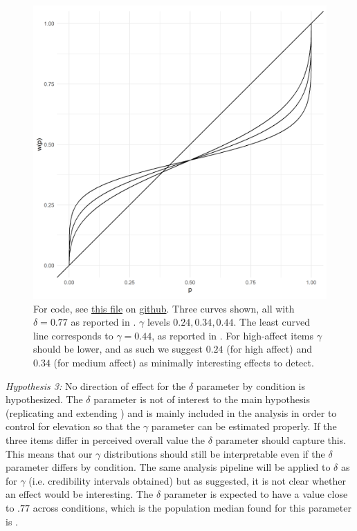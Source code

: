 \documentclass[12pt]{article}
\begin{document}
\begin{figure}[H]
	\includegraphics[width = \linewidth]{../Figures/ourHyp.png}
	\caption{For code, see
		\href{https://github.com/victor-m-p/BayesianDecisionWeights/blob/main/Code/0_visualize_parameters.Rmd}
		{this file} on
		\href{https://github.com/victor-m-p/BayesianDecisionWeights}{github}.
		Three curves shown, all with $\delta = 0.77$
	as reported in \textcite{gonzalez1999shape}.
	$\gamma$ levels $0.24, 0.34, 0.44$. The
	least curved line corresponds to $\gamma = 0.44$,
	as reported in \textcite{gonzalez1999shape}.
	For high-affect items $\gamma$ should
	be lower, and as such we suggest $0.24$
	(for high affect) and  $0.34$ (for medium
	affect) as minimally interesting effects
to detect.}
\end{figure}

\emph{Hypothesis 3:} No direction of effect
for the $\delta$ parameter by condition is
hypothesized. The  $\delta$ parameter is
not of interest to the main hypothesis
(replicating and extending \textcite{rottenstreich2001money})
and is mainly included in the analysis in
order to control for elevation so that the
$\gamma$ parameter can be estimated
properly. If the three items differ
in perceived overall value the $\delta$ parameter
should capture this. This means that our $\gamma$
distributions should still be interpretable
even if the $\delta$ parameter differs by
condition. The same analysis pipeline will be applied
to $\delta$ as for $\gamma$ (i.e. credibility
intervals obtained) but as suggested,
it is not clear whether an effect would
be interesting. The $\delta$ parameter is
expected to have a value close to $.77$
across conditions,
which is the population median found for
this parameter is \textcite{gonzalez1999shape}.
\end{document}
